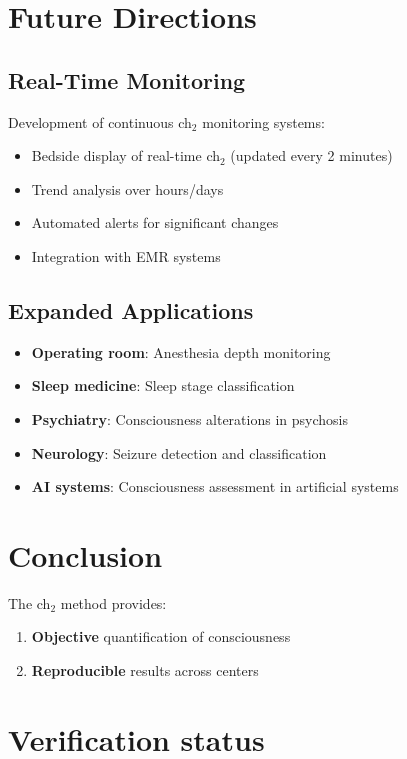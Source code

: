 \section{Future Directions}

\subsection{Real-Time Monitoring}

Development of continuous ch$_2$ monitoring systems:
\begin{itemize}
\item Bedside display of real-time ch$_2$ (updated every 2 minutes)
\item Trend analysis over hours/days
\item Automated alerts for significant changes
\item Integration with EMR systems
\end{itemize}

\subsection{Expanded Applications}

\begin{itemize}
\item \textbf{Operating room}: Anesthesia depth monitoring
\item \textbf{Sleep medicine}: Sleep stage classification
\item \textbf{Psychiatry}: Consciousness alterations in psychosis
\item \textbf{Neurology}: Seizure detection and classification
\item \textbf{AI systems}: Consciousness assessment in artificial systems
\end{itemize}

\section{Conclusion}

The ch$_2$ method provides:
\begin{enumerate}
\item \textbf{Objective} quantification of consciousness
\item \textbf{Reproducible} results across centers
\end{enumerate}

\section{Verification status}
\label{sec:appC-verification}

